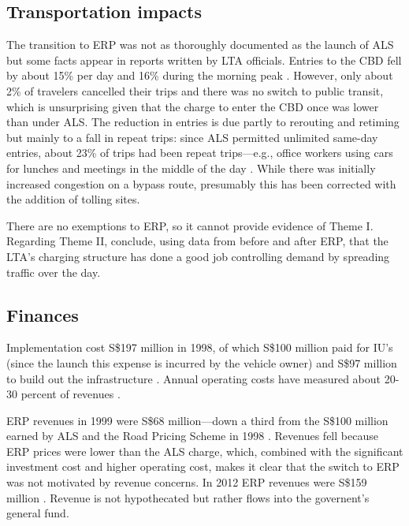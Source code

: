 \subsection{Transportation impacts}

The transition to ERP was not as thoroughly documented as the launch of ALS but some facts appear in reports written by LTA officials. Entries to the CBD fell by about 15\% per day and 16\% during the morning peak \citep[p. 42]{Menon2000}. However, only about 2\% of travelers cancelled their trips and there was no switch to public transit, which is unsurprising given that the charge to enter the CBD once was lower than under ALS. The reduction in entries is due partly to rerouting and retiming but mainly to a fall in repeat trips: since ALS permitted unlimited same-day entries, about 23\% of trips had been repeat trips---e.g., office workers using cars for lunches and meetings in the middle of the day \citep[p. 23]{Chin2009}. While there was initially increased congestion on a bypass route, presumably this has been corrected with the addition of tolling sites. 

There are no exemptions to ERP, so it cannot provide evidence of Theme I. Regarding Theme II, \citet{Olszewski2005} conclude, using data from before and after ERP, that the LTA's charging structure has done a good job controlling demand by spreading traffic over the day.

\subsection{Finances}

Implementation cost S\$197 million in 1998, of which S\$100 million paid for IU's (since the launch this expense is incurred by the vehicle owner) and S\$97 million to build out the infrastructure \citep{Santos2004}. Annual operating costs have measured about 20-30 percent of revenues \citep{Chin2009}.

ERP revenues in 1999 were S\$68 million---down a third from the S\$100 million earned by ALS and the Road Pricing Scheme in 1998 \cite[p. 34]{Goh2002}. Revenues fell because ERP prices were lower than the ALS charge, which, combined with the significant investment cost and higher operating cost, makes it clear that the switch to ERP was not motivated by revenue concerns. In 2012 ERP revenues were S\$159 million \citep{Chen2012}. Revenue is not hypothecated but rather flows into the governent's general fund.
